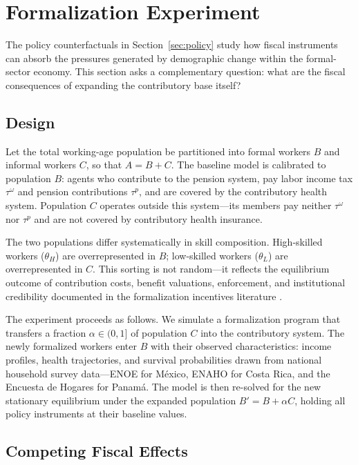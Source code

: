 \documentclass[12pt,a4paper]{article}
\begin{document}
\section{Formalization Experiment}
\label{sec:formalization}

The policy counterfactuals in Section~\ref{sec:policy} study how fiscal instruments can absorb the pressures generated by demographic change within the formal-sector economy. This section asks a complementary question: what are the fiscal consequences of expanding the contributory base itself?

\subsection{Design}
\label{subsec:form_design}

Let the total working-age population be partitioned into formal workers $B$ and informal workers $C$, so that $A = B + C$. The baseline model is calibrated to population $B$: agents who contribute to the pension system, pay labor income tax $\tau^\omega$ and pension contributions $\tau^p$, and are covered by the contributory health system. Population $C$ operates outside this system---its members pay neither $\tau^\omega$ nor $\tau^p$ and are not covered by contributory health insurance.

The two populations differ systematically in skill composition. High-skilled workers ($\theta_H$) are overrepresented in $B$; low-skilled workers ($\theta_L$) are overrepresented in $C$. This sorting is not random---it reflects the equilibrium outcome of contribution costs, benefit valuations, enforcement, and institutional credibility documented in the formalization incentives literature \citep{WorldBankInformalizing2025, BoschMelguizoPages2013}.

The experiment proceeds as follows. We simulate a formalization program that transfers a fraction $\alpha \in (0, 1]$ of population $C$ into the contributory system. The newly formalized workers enter $B$ with their observed characteristics: income profiles, health trajectories, and survival probabilities drawn from national household survey data---ENOE for M\'exico, ENAHO for Costa Rica, and the Encuesta de Hogares for Panam\'a. The model is then re-solved for the new stationary equilibrium under the expanded population $B' = B + \alpha C$, holding all policy instruments at their baseline values.

\subsection{Competing Fiscal Effects}
\label{subsec:form_effects}
\end{document}

